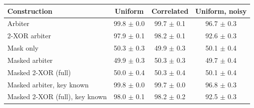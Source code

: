 \begin{tabular}{lccc}
\toprule
Construction & Uniform & Correlated & Uniform, noisy \\
\midrule
Arbiter & 99.8 $\pm$ 0.0 & 99.7 $\pm$ 0.1 & 96.7 $\pm$ 0.3 \\
2-XOR arbiter & 97.9 $\pm$ 0.1 & 98.2 $\pm$ 0.1 & 92.6 $\pm$ 0.3 \\
Mask only & 50.3 $\pm$ 0.3 & 49.9 $\pm$ 0.3 & 50.1 $\pm$ 0.4 \\
Masked arbiter & 49.9 $\pm$ 0.3 & 50.3 $\pm$ 0.3 & 49.7 $\pm$ 0.4 \\
Masked 2-XOR (full) & 50.0 $\pm$ 0.4 & 50.3 $\pm$ 0.4 & 50.1 $\pm$ 0.4 \\
\midrule
Masked arbiter, key known & 99.8 $\pm$ 0.0 & 99.7 $\pm$ 0.0 & 96.8 $\pm$ 0.3 \\
Masked 2-XOR (full), key known & 98.0 $\pm$ 0.1 & 98.2 $\pm$ 0.2 & 92.5 $\pm$ 0.3 \\
\bottomrule
\end{tabular}
